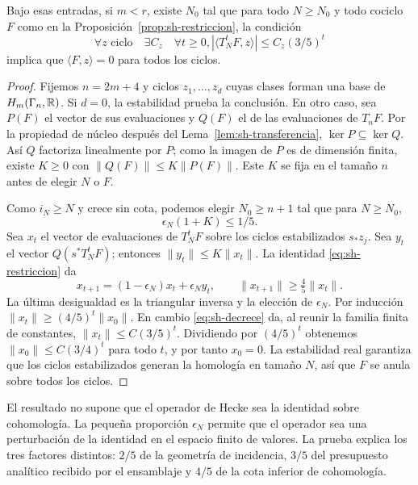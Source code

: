 \begin{teorema}
\label{thm:sh-hecke}
Bajo esas entradas, si $m<r$, existe $N_0$ tal que para todo $N\ge N_0$ y todo cociclo $F$ como en la Proposición~\ref{prop:sh-restriccion}, la condición
\begin{equation}
 \forall z\text{ ciclo}\quad\exists C_z\quad\forall t\ge0,
       |\langle T_N^tF,z\rangle|\le C_z(3/5)^t
 \label{eq:sh-decrece}
\end{equation}
implica que $\langle F,z\rangle=0$ para todos los ciclos.
\end{teorema}
\begin{proof}
Fijemos $n=2m+4$ y ciclos $z_1,\ldots,z_d$ cuyas clases forman una base de $H_m(\Gamma_n,\mathbb{R})$. Si $d=0$, la estabilidad prueba la conclusión. En otro caso, sea $P(F)$ el vector de sus evaluaciones y $Q(F)$ el de las evaluaciones de $T_nF$. Por la propiedad de núcleo después del Lema~\ref{lem:sh-transferencia}, $\ker P\subseteq\ker Q$. Así $Q$ factoriza linealmente por $P$; como la imagen de $P$ es de dimensión finita, existe $K\ge0$ con $\|Q(F)\|\le K\|P(F)\|$. Este $K$ se fija en el tamaño $n$ antes de elegir $N$ o $F$.

Como $i_N\ge N$ y crece sin cota, podemos elegir $N_0\ge n+1$ tal que para $N\ge N_0$,
\[
 \epsilon_N(1+K)\le1/5.
\]
Sea $x_t$ el vector de evaluaciones de $T_N^tF$ sobre los ciclos estabilizados $s_*z_j$. Sea $y_t$ el vector $Q(s^*T_N^tF)$; entonces $\|y_t\|\le K\|x_t\|$. La identidad \eqref{eq:sh-restriccion} da
\begin{equation}
 x_{t+1}=(1-\epsilon_N)x_t+\epsilon_Ny_t,
 \qquad \|x_{t+1}\|\ge\tfrac45\|x_t\|.
 \label{eq:sh-inferior}
\end{equation}
La última desigualdad es la triangular inversa y la elección de $\epsilon_N$. Por inducción $\|x_t\|\ge(4/5)^t\|x_0\|$. En cambio \eqref{eq:sh-decrece} da, al reunir la familia finita de constantes, $\|x_t\|\le C(3/5)^t$. Dividiendo por $(4/5)^t$ obtenemos $\|x_0\|\le C(3/4)^t$ para todo $t$, y por tanto $x_0=0$. La estabilidad real garantiza que los ciclos estabilizados generan la homología en tamaño $N$, así que $F$ se anula sobre todos los ciclos.
\end{proof}

El resultado no supone que el operador de Hecke sea la identidad sobre cohomología. La pequeña proporción $\epsilon_N$ permite que el operador sea una perturbación de la identidad en el espacio finito de valores. La prueba explica los tres factores distintos: $2/5$ de la geometría de incidencia, $3/5$ del presupuesto analítico recibido por el ensamblaje y $4/5$ de la cota inferior de cohomología.

